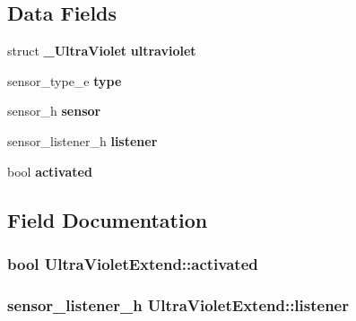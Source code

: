 \subsection*{Data Fields}
\begin{DoxyCompactItemize}
\item 
struct {\bf \-\_\-\-Ultra\-Violet} {\bfseries ultraviolet}\label{structUltraVioletExtend_a4d209224ec618e4eff8019275b5b4590}

\item 
sensor\-\_\-type\-\_\-e {\bfseries type}\label{structUltraVioletExtend_a1b43d62626aa06deb8788c40025d78fe}

\item 
sensor\-\_\-h {\bfseries sensor}\label{structUltraVioletExtend_ae2129bb3233f3f5cad3cf668b57bf830}

\item 
sensor\-\_\-listener\-\_\-h {\bfseries listener}\label{structUltraVioletExtend_a570c16fb200cda00f4d237b7bcbd7c04}

\item 
bool {\bfseries activated}\label{structUltraVioletExtend_ac538df0821d7679dcd79b79daed92768}

\end{DoxyCompactItemize}


\subsection{Field Documentation}
\subsubsection[{activated}]{\setlength{\rightskip}{0pt plus 5cm}bool Ultra\-Violet\-Extend\-::activated}\label{structUltraVioletExtend_ac538df0821d7679dcd79b79daed92768}
\subsubsection[{listener}]{\setlength{\rightskip}{0pt plus 5cm}sensor\-\_\-listener\-\_\-h Ultra\-Violet\-Extend\-::listener}\label{structUltraVioletExtend_a570c16fb200cda00f4d237b7bcbd7c04}
